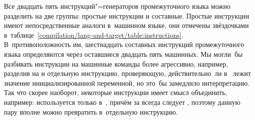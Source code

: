 Все двадцать пять инструкций"=генераторов промежуточного языка можно разделить
на две группы: простые инструкции и составные. Простые инструкции имеют
непосредственные аналоги в~машинном языке, они отмечены звёздочками
в~таблице~\ref{compilation/lang-and-target/table:instructions}.
В~противоположность им, шестнадцать составных инструкций промежуточного языка
определяются через оставшиеся двадцать пять машинных. Мы могли~бы разбивать
инструкции на машинные команды более агрессивно, например, разделив
 на  и отдельную инструкцию, проверяющую,
действительно~ли в~ лежит значение инициализированной переменной, но
это~бы замедлило интерпретацию. Так что скорее наоборот, некоторые инструкции
имеет смысл объединить, например:  используется только
в~, причём за  всегда следует , поэтому
данную пару вполне можно превратить в~отдельную инструкцию.


